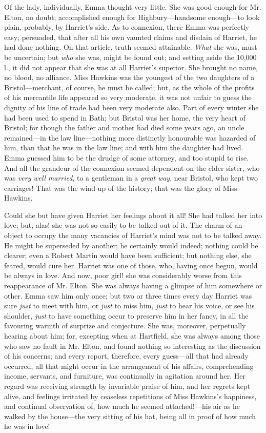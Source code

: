 Of the lady, individually, Emma thought very little. She was good enough for Mr. Elton, no doubt; accomplished enough for Highbury---handsome enough---to look plain, probably, by Harriet's side. As to connexion, there Emma was perfectly easy; persuaded, that after all his own vaunted claims and disdain of Harriet, he had done nothing. On that article, truth seemed attainable. {\em What} she was, must be uncertain; but {\em who} she was, might be found out; and setting aside the 10,000 l., it did not appear that she was at all Harriet's superior. She brought no name, no blood, no alliance. Miss Hawkins was the youngest of the two daughters of a Bristol---merchant, of course, he must be called; but, as the whole of the profits of his mercantile life appeared so very moderate, it was not unfair to guess the dignity of his line of trade had been very moderate also. Part of every winter she had been used to spend in Bath; but Bristol was her home, the very heart of Bristol; for though the father and mother had died some years ago, an uncle remained---in the law line---nothing more distinctly honourable was hazarded of him, than that he was in the law line; and with him the daughter had lived. Emma guessed him to be the drudge of some attorney, and too stupid to rise. And all the grandeur of the connexion seemed dependent on the elder sister, who was {\em very} {\em well} {\em married}, to a gentleman in a {\em great} {\em way}, near Bristol, who kept two carriages! That was the wind-up of the history; that was the glory of Miss Hawkins.

Could she but have given Harriet her feelings about it all! She had talked her into love; but, alas! she was not so easily to be talked out of it. The charm of an object to occupy the many vacancies of Harriet's mind was not to be talked away. He might be superseded by another; he certainly would indeed; nothing could be clearer; even a Robert Martin would have been sufficient; but nothing else, she feared, would cure her. Harriet was one of those, who, having once begun, would be always in love. And now, poor girl! she was considerably worse from this reappearance of Mr. Elton. She was always having a glimpse of him somewhere or other. Emma saw him only once; but two or three times every day Harriet was sure {\em just} to meet with him, or {\em just} to miss him, {\em just} to hear his voice, or see his shoulder, {\em just} to have something occur to preserve him in her fancy, in all the favouring warmth of surprize and conjecture. She was, moreover, perpetually hearing about him; for, excepting when at Hartfield, she was always among those who saw no fault in Mr. Elton, and found nothing so interesting as the discussion of his concerns; and every report, therefore, every guess---all that had already occurred, all that might occur in the arrangement of his affairs, comprehending income, servants, and furniture, was continually in agitation around her. Her regard was receiving strength by invariable praise of him, and her regrets kept alive, and feelings irritated by ceaseless repetitions of Miss Hawkins's happiness, and continual observation of, how much he seemed attached!---his air as he walked by the house---the very sitting of his hat, being all in proof of how much he was in love!


